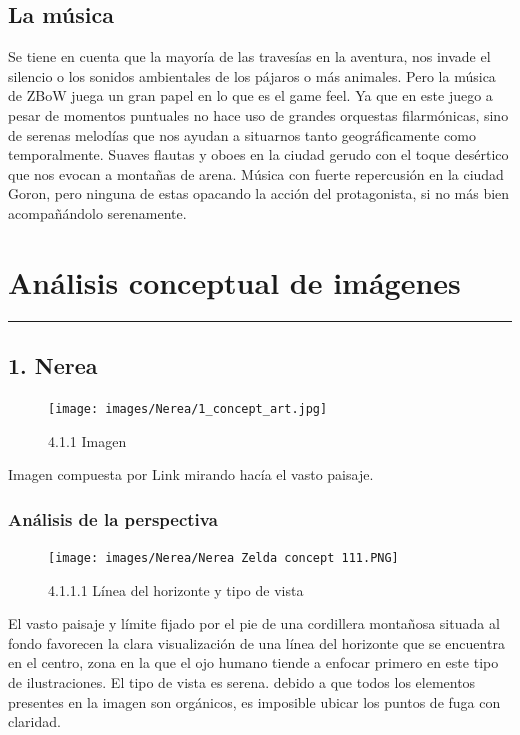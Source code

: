 \documentclass[12pt]{article}
\begin{document}
\subsection{La música}
Se tiene en cuenta que la mayoría de las travesías en la aventura, nos invade el silencio o los sonidos ambientales de los pájaros o más animales. Pero la música de ZBoW juega un gran papel en lo que es el game feel. Ya que en este juego a pesar de momentos puntuales no hace uso de grandes orquestas filarmónicas, sino de serenas melodías que nos ayudan a situarnos tanto geográficamente como temporalmente. Suaves flautas y oboes en la ciudad gerudo con el toque desértico que nos evocan a montañas de arena. Música con fuerte repercusión en la ciudad Goron, pero ninguna de estas opacando la acción del protagonista, si no más bien acompañándolo serenamente.


\newpage
\section{Análisis conceptual de imágenes}
    \hrule
\vspace{1cm}
    \subsection{1. Nerea}
    \begin{figure}[H]
      \centering
      \texttt{[image: images/Nerea/1\_concept\_art.jpg]}
      \caption{\small 4.1.1 Imagen}
    \end{figure}
    Imagen compuesta por Link mirando hacía el vasto paisaje.

    
        \subsubsection{Análisis de la perspectiva}


    \begin{figure}[H]
      \centering
      \texttt{[image: images/Nerea/Nerea Zelda concept 111.PNG]}
      \caption{\small 4.1.1.1 Línea del horizonte y tipo de vista}
    \end{figure}

    El vasto paisaje y límite fijado por el pie de una cordillera montañosa situada al fondo favorecen la clara visualización de una línea del horizonte que se encuentra en el centro, zona en la que el ojo humano tiende a enfocar primero en este tipo de ilustraciones. El tipo de vista es serena.
    debido a que todos los elementos presentes en la imagen son orgánicos, es imposible ubicar los puntos de fuga con claridad.
\end{document}
